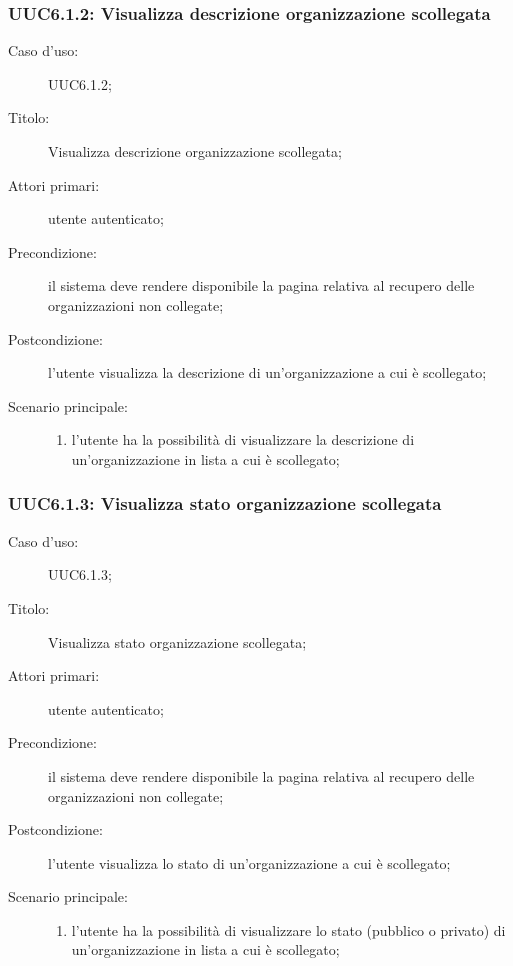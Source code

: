 \documentclass[../../../analisi-dei-requisiti.tex]{subfiles}
\begin{document}
\subsubsection{UUC6.1.2: Visualizza descrizione organizzazione scollegata}%
\label{subs:UUC6.1.2}
\begin{description}
  \item[Caso d’uso:] UUC6.1.2;
  \item[Titolo:] Visualizza descrizione organizzazione scollegata;
  \item[Attori primari:] utente autenticato;
  \item[Precondizione:] il sistema deve rendere disponibile la pagina relativa al recupero delle organizzazioni non collegate;
  \item[Postcondizione:] l'utente visualizza la descrizione di un'organizzazione a cui è scollegato;
  \item[Scenario principale:]
        \begin{enumerate}
          \item l'utente ha la possibilità di visualizzare la descrizione di un'organizzazione in lista a cui è scollegato;
        \end{enumerate}
\end{description}

\subsubsection{UUC6.1.3: Visualizza stato organizzazione scollegata}%
\label{subs:UUC6.1.3}
\begin{description}
  \item[Caso d’uso:] UUC6.1.3;
  \item[Titolo:] Visualizza stato organizzazione scollegata;
  \item[Attori primari:] utente autenticato;
  \item[Precondizione:] il sistema deve rendere disponibile la pagina relativa al recupero delle organizzazioni non collegate;
  \item[Postcondizione:] l'utente visualizza lo stato di un'organizzazione a cui è scollegato;
  \item[Scenario principale:]
        \begin{enumerate}
          \item l'utente ha la possibilità di visualizzare lo stato (pubblico o privato) di un'organizzazione in lista a cui è scollegato;
        \end{enumerate}
\end{description}
\end{document}
